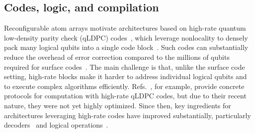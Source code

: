 \documentclass[reprint,twocolumn,secnumarabic,amssymb, aps, prx]{revtex4-2}
\begin{document}
\subsection*{Codes, logic, and compilation}
Reconfigurable atom arrays motivate architectures based on high-rate quantum low-density parity check (qLDPC) codes~\cite{breuckmann2021quantum}, which leverage nonlocality to densely pack many logical qubits into a single code block~\cite{bravyi2010tradeoffs}. Such codes can substantially reduce the overhead of error correction compared to the millions of qubits required for surface codes~\cite{xu2024constant, bravyi2024high, Breuckmann2021, panteleev2022asymptotically}. The main challenge is that, unlike the surface code setting, high-rate blocks make it harder to address individual logical qubits and to execute complex algorithms efficiently. Refs.~\cite{xu2024constant, bravyi2024high}, for example, provide concrete protocols for computation with high-rate qLDPC codes, but due to their recent nature, they were not yet highly optimized. Since then, key ingredients for architectures leveraging high-rate codes have improved substantially, particularly decoders~\cite{hillmann2024localized, muller2025improved} and logical operations~\cite{cross2024improved, williamson2024low, cowtan2025fast, he2025extractors, xu2025fast, malcolm2025computing, zheng2025high, li2025transversal, menon2025magic, xu2025batched}.
\end{document}
